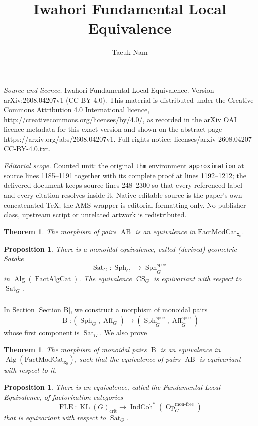 \documentclass[10pt,a4paper]{amsart}
\newtheorem{prop}[subsubsection]{Proposition}
\newtheorem{thm}[subsubsection]{Theorem}
\newcommand{\on}[1]{\operatorname{#1}}
\newcommand{\IndCoh}{\on{IndCoh}}
\newcommand{\Gcheck}{\check{G}}
\newcommand{\FactAlgCat}{\on{FactAlgCat}}
\newcommand{\FactModCat}{\on{FactModCat_{x_0}}}
\newcommand{\sssec}[1]{\subsubsection{}}
\begin{document}
\title[Iwahori Fundamental Local Equivalence]{Iwahori Fundamental Local Equivalence}
\author{Taeuk Nam}
\date{}
\maketitle
\noindent\emph{Source and licence.} Iwahori Fundamental Local Equivalence. Version arXiv:2608.04207v1 (CC BY 4.0). This material is distributed under the Creative Commons Attribution 4.0 International licence, http://creativecommons.org/licenses/by/4.0/, as recorded in the arXiv OAI licence metadata for this exact version and shown on the abstract page https://arxiv.org/abs/2608.04207v1. Full rights notice: licenses/arxiv-2608.04207-CC-BY-4.0.txt.\par\smallskip
\noindent\textit{Editorial scope.} Counted unit: the original \texttt{thm} environment \texttt{approximation} at source lines 1185--1191 together with its complete proof at lines 1192--1212; the delivered document keeps source lines 248--2300 so that every referenced label and every citation resolves inside it. Native editable source is the paper's own concatenated TeX; the AMS wrapper is editorial formatting only. No publisher class, upstream script or unrelated artwork is redistributed.
\begin{thm} \label{Theorem AB}
    The morphism of pairs $\on{AB}$ is an equivalence in $\FactModCat$.
\end{thm}

\begin{prop} \cite{GLC2}
    There is a monoidal equivalence, called (derived) geometric Satake
    $$
    \on{Sat}_{G} : \on{Sph}_G \longrightarrow \on{Sph}_{\Gcheck}^{\on{spec}}
    $$
    in $\on{Alg}(\FactAlgCat)$. The equivalence $\on{CS}_G$ is equivariant with respect to $\on{Sat}_G$.
\end{prop}

\sssec{}
In Section \ref{Section B}, we construct a morphism of monoidal pairs
$$
\on{B} : (\on{Sph}_G, \on{Aff}_G) \longrightarrow (\on{Sph}_{\Gcheck}^{\on{spec}}, \on{Aff}_{\Gcheck}^{\on{spec}})
$$
whose first component is $\on{Sat}_G$. We also prove

\begin{thm} \label{Theorem B}
    The morphism of monoidal pairs $\on{B}$ is an equivalence in $\on{Alg}(\FactModCat)$, such that the equivalence of pairs $\on{AB}$ is equivariant with respect to it.
\end{thm}

\begin{prop} \cite{GLC2}
    There is an equivalence, called the Fundamental Local Equivalence, of factorization categories
    $$
    \on{FLE}: \on{KL}(G)_{\on{crit}} \longrightarrow \IndCoh^*(\on{Op}_{\Gcheck}^{\on{mon-free}})
    $$
    that is equivariant with respect to $\on{Sat}_G$.
\end{prop}
\end{document}
